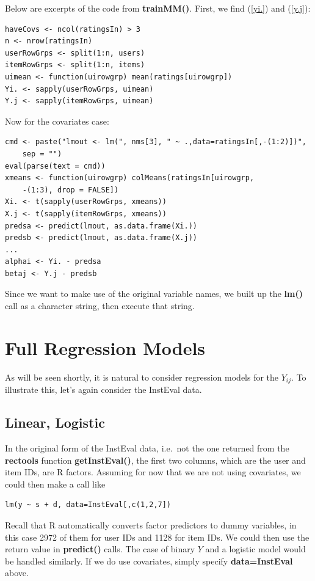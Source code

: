 Below are excerpts of the code from \textbf{trainMM()}.  First, we find
(\ref{yi.}) and (\ref{y.j}):

\begin{lstlisting}
haveCovs <- ncol(ratingsIn) > 3
n <- nrow(ratingsIn)
userRowGrps <- split(1:n, users)
itemRowGrps <- split(1:n, items)
uimean <- function(uirowgrp) mean(ratings[uirowgrp])
Yi. <- sapply(userRowGrps, uimean)
Y.j <- sapply(itemRowGrps, uimean)
\end{lstlisting}

Now for the covariates case:

\begin{lstlisting}
cmd <- paste("lmout <- lm(", nms[3], " ~ .,data=ratingsIn[,-(1:2)])",
    sep = "")
eval(parse(text = cmd))
xmeans <- function(uirowgrp) colMeans(ratingsIn[uirowgrp,
    -(1:3), drop = FALSE])
Xi. <- t(sapply(userRowGrps, xmeans))
X.j <- t(sapply(itemRowGrps, xmeans))
predsa <- predict(lmout, as.data.frame(Xi.))
predsb <- predict(lmout, as.data.frame(X.j))
...
alphai <- Yi. - predsa
betaj <- Y.j - predsb
\end{lstlisting}

Since we want to make use of the original variable names, we built up
the \textbf{lm()} call as a character string, then execute that string.

\section{Full Regression Models}

As will be seen shortly, it is natural to consider regression models for
the $Y_{ij}$.  To illustrate this, let's again consider the InstEval
data.

\subsection{Linear, Logistic}
\label{linlog}

In the original form of the InstEval data, i.e.\ not the one returned
from the \textbf{rectools} function \textbf{getInstEval()}, the first
two columns, which are the user and item IDs, are R factors.  Assuming
for now that we are not using covariates, we could
then make a call like

\begin{lstlisting}
lm(y ~ s + d, data=InstEval[,c(1,2,7]) 
\end{lstlisting}

Recall that R automatically converts factor predictors to dummy
variables, in this case 2972 of them for user IDs and 1128 for item IDs.
We could then use the return value in \textbf{predict()} calls.
The case of binary $Y$ and a logistic model would be handled similarly.
If we do use covariates, simply specify \textbf{data=InstEval} above.

